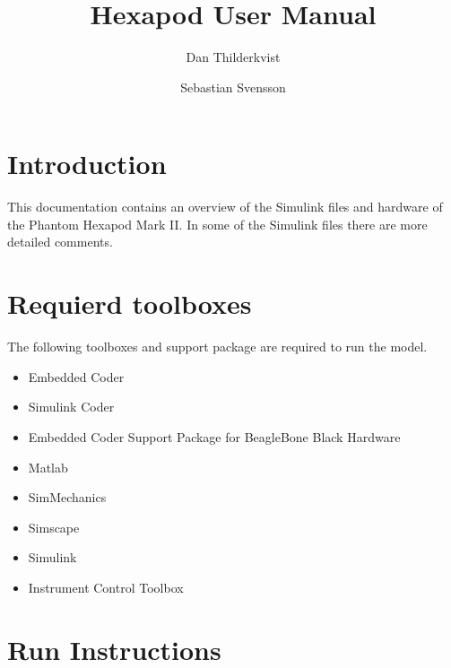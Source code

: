 \documentclass[letterpaper, 10 pt]{report}
\begin{document}
\title{Hexapod User Manual}
\author{Dan Thilderkvist \and Sebastian Svensson}
\maketitle
\pagestyle{empty}

\tableofcontents
\newpage

\section{Introduction}
This documentation contains an overview of the Simulink files and hardware of the Phantom Hexapod Mark II.
In some of the Simulink files there are more detailed comments.


\section{Requierd toolboxes}
The following toolboxes and support package are required to run the model.

\begin{itemize}
\item Embedded Coder
\item Simulink Coder
\item Embedded Coder Support Package for BeagleBone Black Hardware 
\item Matlab
\item SimMechanics
\item Simscape
\item Simulink
\item Instrument Control Toolbox
\end{itemize}



\section{Run Instructions}

\end{document}
